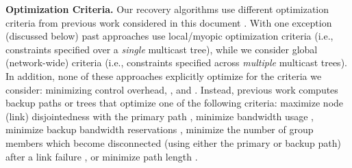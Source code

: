 {\bf Optimization Criteria.}
Our recovery algorithms use different optimization criteria from previous work considered in this document \cite{Cui04,Fei01,Kodialam02,Lau05,Li06,Luebben09,Medard99,Pointurier02,Wu97}. 
With one exception \cite{Li06} (discussed below) past approaches use local/myopic optimization criteria (i.e., constraints specified over a \emph{single} multicast tree),
while we consider global (network-wide) criteria (i.e., constraints specified across \emph{multiple} multicast trees).  In addition, none of these approaches explicitly optimize
for the criteria we consider: minimizing control overhead, , and 
.
Instead, previous work computes backup paths or trees that optimize one of the following criteria: maximize node (link) disjointedness with the primary 
path \cite{Cui04,Fei01,Luebben09,Medard99}, minimize bandwidth usage \cite{Wu97}, minimize backup bandwidth reservations \cite{Kodialam02,Lau05,Li06}, minimize the number of group members which become disconnected (using either the primary or backup path) after a link failure \cite{Pointurier02}, or minimize path length \cite{Tian05}.







